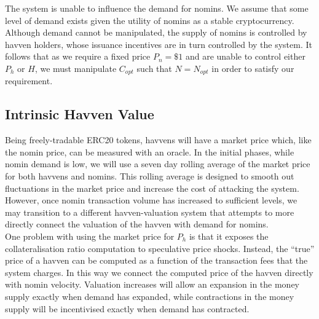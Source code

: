 \begin{center}
\end{center}

\noindent The system is unable to influence the demand for nomins. We assume that some level of demand exists given the utility of nomins as a stable cryptocurrency. Although demand cannot be manipulated, the supply of nomins is controlled by havven holders, whose issuance incentives are in turn controlled by the system. It follows that as we require a fixed price $P_n = \$1 $ and are unable to control either $P_h$ or $H$, we must manipulate $C_{opt}$ such that $N = N_{opt}$ in order to satisfy our requirement.

\subsection{Intrinsic Havven Value}

\noindent Being freely-tradable ERC20 tokens, havvens will have a market price which, like
the nomin price, can be measured with an oracle. In the initial phases, while nomin demand is low, 
we will use a seven day rolling average of the market price for both havvens and nomins. This rolling
average is designed to smooth out fluctuations in the market price and increase the cost of attacking the
system. However, once nomin transaction volume has increased to sufficient levels, we may transition to a different
havven-valuation system that attempts to more directly connect the valuation of the havven with demand for nomins. \\

\noindent One problem with using the market price for $P_h$ is that it exposes the
collateralisation ratio computation to speculative price shocks.
Instead, the ``true'' price of a havven can be computed as a function of the transaction
fees that the system charges. In this way we connect the computed price of the havven directly with
nomin velocity.
Valuation increases will allow an expansion in the money supply exactly when demand has expanded,
while contractions in the money supply will be incentivised exactly when demand has contracted. \\

